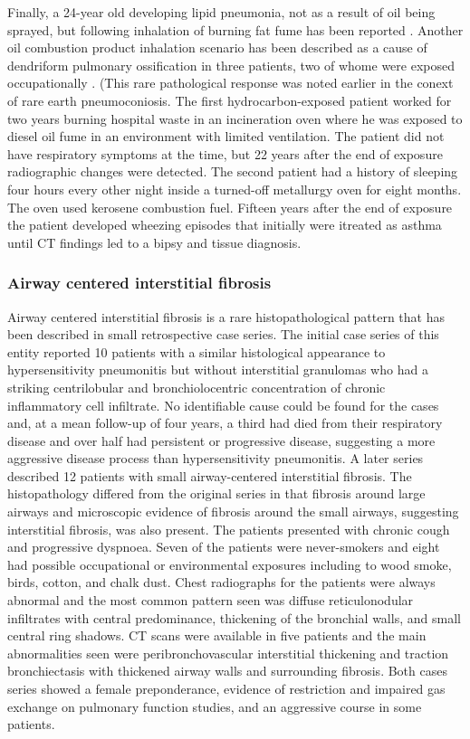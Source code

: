 \documentclass[a4
er,12pt]{article}
\begin{document}
Finally, a 24-year old developing lipid pneumonia, not as a result of oil being sprayed, but following inhalation of burning fat fume has been
reported \cite{Oldenburger1972}. Another oil combustion product inhalation scenario has been described as a cause of dendriform pulmonary ossification in three patients, two of whome were exposed occupationally \cite{Martinez2008}. (This rare pathological response was noted earlier in the conext of rare earth pneumoconiosis. The first hydrocarbon-exposed patient worked for two years burning hospital waste in an incineration oven where he was exposed to diesel oil fume in an environment with limited ventilation. The patient did not have respiratory symptoms at the time, but 22 years after the end of exposure radiographic changes were detected. The second patient had a history of sleeping four hours every other night inside a turned-off metallurgy oven for eight months. The oven used kerosene combustion fuel. Fifteen years after the end of exposure the patient developed wheezing episodes that initially were itreated as asthma until CT findings led to a bipsy and tissue diagnosis. 


\subsubsection{Airway centered interstitial fibrosis}
Airway centered interstitial fibrosis is a rare histopathological pattern that has been described in small retrospective case series. The initial case series \cite{Yousem2002} of this entity reported 10 patients with a similar histological appearance to hypersensitivity pneumonitis but without interstitial granulomas who had a striking centrilobular and bronchiolocentric concentration of chronic inflammatory cell infiltrate. No identifiable cause could be found for the cases and, at a mean follow-up of four years, a third had died from their respiratory disease and over half had persistent or progressive disease, suggesting a more aggressive disease process than hypersensitivity pneumonitis. A later series \cite{Churg2004} described 12 patients with small airway-centered interstitial fibrosis. The histopathology differed from the original series in that fibrosis around large airways and microscopic evidence of fibrosis around the small airways, suggesting interstitial fibrosis, was also present. The patients presented with chronic cough and progressive dyspnoea. Seven of the patients were never-smokers and eight had possible occupational or environmental exposures including to wood smoke, birds, cotton, and chalk dust. Chest radiographs for the patients were always abnormal and the most common pattern seen was diffuse reticulonodular infiltrates with central predominance, thickening of the bronchial walls, and small central ring shadows. CT scans were available in five patients and the main abnormalities seen were peribronchovascular interstitial thickening and traction bronchiectasis with thickened airway walls and surrounding fibrosis. Both cases series showed a female preponderance, evidence of restriction and impaired gas exchange on pulmonary function studies, and an aggressive course in some patients.
\end{document}
